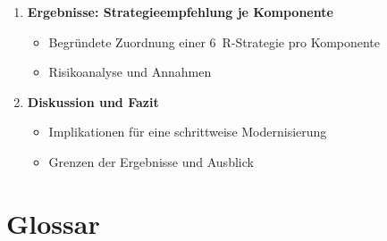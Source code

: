 \begin{enumerate}
  \item \textbf{Ergebnisse: Strategieempfehlung je Komponente}
  \begin{itemize}
    \item Begründete Zuordnung einer 6~R-Strategie pro Komponente
    \item Risikoanalyse und Annahmen
  \end{itemize}

  \item \textbf{Diskussion und Fazit}
  \begin{itemize}
    \item Implikationen für eine schrittweise Modernisierung
    \item Grenzen der Ergebnisse und Ausblick
  \end{itemize}
\end{enumerate}

\section*{Glossar}


